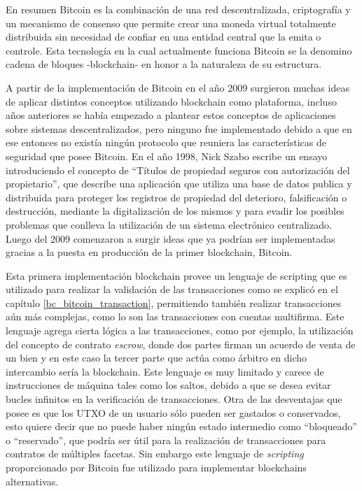 En resumen Bitcoin es la combinación de una red descentralizada, criptografía y un mecanismo de consenso que permite crear una moneda virtual totalmente distribuida sin necesidad de confiar en una entidad central que la emita o controle. Esta tecnología en la cual actualmente funciona Bitcoin se la denomino cadena de bloques -blockchain- en honor a la naturaleza de su estructura.

A partir de la implementación de Bitcoin en el año 2009 surgieron muchas ideas de aplicar distintos conceptos utilizando blockchain como plataforma, incluso años anteriores se había empezado a plantear estos conceptos de aplicaciones sobre sistemas descentralizados, pero ninguno fue implementado debido a que en ese entonces no existía ningún protocolo que reuniera las características de seguridad que posee Bitcoin. En el año 1998, Nick Szabo escribe un ensayo introduciendo el concepto de ``Títulos de propiedad seguros con autorización del propietario''\cite{szabo1998secure}, que describe una aplicación que utiliza una base de datos publica y distribuida para proteger los registros de propiedad del deterioro, falsificación o destrucción, mediante la digitalización de los mismos y para evadir los posibles problemas que conlleva la utilización de un sistema electrónico centralizado. Luego del 2009 comenzaron a surgir ideas que ya podrían ser implementadas gracias a la puesta en producción de la primer blockchain, Bitcoin.

Esta primera implementación blockchain provee un lenguaje de scripting que es utilizado para realizar la validación de las transacciones como se explicó en el capítulo \ref{bc_bitcoin_transaction}, permitiendo también realizar transacciones aún más complejas, como lo son las transacciones con cuentas multifirma. Este lenguaje agrega cierta lógica a las transacciones, como por ejemplo, la utilización del concepto de contrato \textit{escrow}, donde dos partes firman un acuerdo de venta de un bien y en este caso la tercer parte que actúa como árbitro en dicho intercambio sería la blockchain. Este lenguaje es muy limitado y carece de instrucciones de máquina tales como los saltos, debido a que se desea evitar bucles infinitos en la verificación de transacciones. Otra de las desventajas que posee es que los UTXO de un usuario sólo pueden ser gastados o conservados, esto quiere decir que no puede haber ningún estado intermedio como ``bloqueado'' o ``reservado'', que podría ser útil para la realización de transacciones para contratos de múltiples facetas. Sin embargo este lenguaje de \textit{scripting} proporcionado por Bitcoin fue utilizado para implementar blockchains alternativas.

